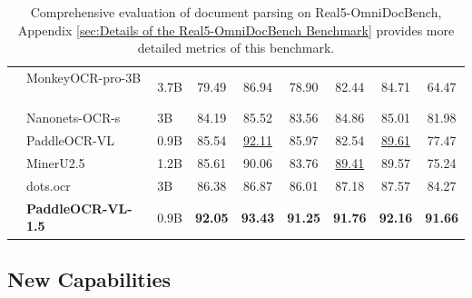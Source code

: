 \documentclass[11pt, a4paper,logo,  copyright, nonumbering]{paddleocr}
\begin{document}
\begin{table}[H]
{\begin{tabular}{l|ll|c|c c c c c}
         & MonkeyOCR-pro-3B ~\cite{li2025monkeyocr} & 3.7B & 79.49 & 86.94 & 78.90 & 82.44 & 84.71 & 64.47\\
         & Nanonets-OCR-s~\cite{Nanonets-OCR-S} & 3B & 84.19 & 85.52 & 83.56 & 84.86 & 85.01 & 81.98\\
         & PaddleOCR-VL~\cite{cui2025paddleocrvl} & 0.9B & 85.54 & \cellcolor{cyan!15}\underline{92.11} & 85.97 & 82.54 & \cellcolor{cyan!15}\underline{89.61} & 77.47\\
         & MinerU2.5~\cite{niu2025mineru2} & 1.2B & 85.61 & 90.06 & 83.76 & \cellcolor{cyan!15}\underline{89.41} & 89.57 & 75.24\\
         & dots.ocr~\cite{dotsocr} & 3B & 86.38 & 86.87 & 86.01 & 87.18 & 87.57 & 84.27\\
         & \textbf{PaddleOCR-VL-1.5} & 0.9B & \cellcolor{red!15}\textbf{92.05} & \cellcolor{red!15}\textbf{93.43} & \cellcolor{red!15}\textbf{91.25} & \cellcolor{red!15}\textbf{91.76} & \cellcolor{red!15}\textbf{92.16} & \cellcolor{red!15}\textbf{91.66}\\
        \bottomrule
    \end{tabular}%
    }
    \caption{Comprehensive evaluation of document parsing on Real5-OmniDocBench, Appendix \ref{sec:Details of the Real5-OmniDocBench Benchmark} provides more detailed metrics of this benchmark.}
    \label{tab:real5-omnidocbench-performance}
\end{table}






\subsection{New Capabilities}
\end{document}
